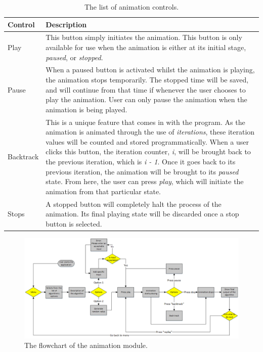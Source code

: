 \begin{table}[H]
\caption{The list of animation controls.}
\begin{center}
\begin{tabular}{| p{4cm} | p{11cm} |}
		\hline
		\textbf{Control} & \textbf{Description} \\ \hline
		Play & This button simply initiates the animation. This button is only available for use when the animation is either at its initial stage, \textit{paused}, or \textit{stopped}. \\ \hline
     Pause & When a paused button is activated whilst the animation is playing, the animation stops temporarily. The stopped time will be saved, and will continue from that time if whenever the user chooses to play the animation. User can only pause the animation when the animation is being played. \\ \hline
     Backtrack &  This is a unique feature that comes in with the program. As the animation is animated through the use of \textit{iterations}, these iteration values will be counted and stored programmatically. When a user clicks this button, the iteration counter, \textit{i}, will be brought back to the previous iteration, which is \textit{i - 1}. Once it goes back to its previous iteration, the animation will be brought to its \textit{paused} state. From here, the user can press \textit{play}, which will initiate the animation from that particular state. \\ \hline
     Stops &  A stopped button will completely halt the process of the animation. Its final playing state will be discarded once a stop button is selected. \\ \hline
\end{tabular}
\end{center}
\label{tab:animationControls}
\end{table}

\begin{landscape}
\begin{figure}[H]
\centering
\hspace*{-2cm}
\includegraphics[scale=0.9]{images/report_images/flowchartAnimation.png}
\caption{The flowchart of the animation module.}
\label{flowchartAnimation}
\end{figure}
\end{landscape}

